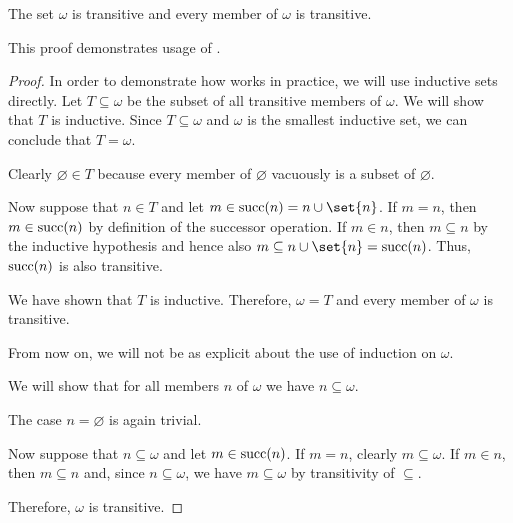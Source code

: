\begin{proposition}\label{thm:omega_is_transitive}
  The set \( \omega \) is transitive and every member of \( \omega \) is transitive.

  This proof demonstrates usage of .
\end{proposition}
\begin{proof}
   In order to demonstrate how  works in practice, we will use inductive sets directly. Let \( T \subseteq \omega \) be the subset of all transitive members of \( \omega \). We will show that \( T \) is inductive. Since \( T \subseteq \omega \) and \( \omega \) is the smallest inductive set, we can conclude that \( T = \omega \).

  Clearly \( \varnothing \in T \)  because every member of \( \varnothing \) vacuously is a subset of \( \varnothing \).

  Now suppose that \( n \in T \) and let \( m \in \op{succ}(n) = n \cup \set{ n } \). If \( m = n \), then \( m \in \operatorname{succ}(n) \) by definition of the successor operation. If \( m \in n \), then \( m \subseteq n \) by the inductive hypothesis and hence also \( m \subseteq n \cup \set{ n } = \op{succ}(n) \). Thus, \( \operatorname{succ}(n) \) is also transitive.

  We have shown that \( T \) is inductive. Therefore, \( \omega = T \) and every member of \( \omega \) is transitive.

  From now on, we will not be as explicit about the use of induction on \( \omega \).

   We will show that for all members \( n \) of \( \omega \) we have \( n \subseteq \omega \).

  The case \( n = \varnothing \) is again trivial.

  Now suppose that \( n \subseteq \omega \) and let \( m \in \operatorname{succ}(n) \). If \( m = n \), clearly \( m \subseteq \omega \). If \( m \in n \), then \( m \subseteq n \) and, since \( n \subseteq \omega \), we have \( m \subseteq \omega \) by transitivity of \( \subseteq \).

  Therefore, \( \omega \) is transitive.
\end{proof}

